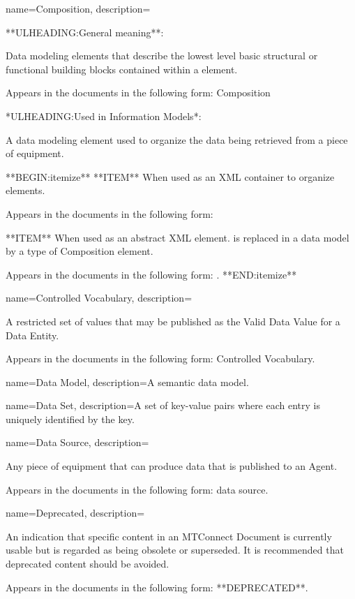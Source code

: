 {
    name={Composition},
	description={
  **ULHEADING:General meaning**:

  Data modeling elements that describe the lowest level basic structural or functional building blocks contained within a  element.

  Appears in the documents in the following form: \gls{Composition}

  *ULHEADING:Used in \gls{Information Models}*:

  A data modeling element used to organize the data being retrieved from a piece of equipment.

  **BEGIN:itemize**
      **ITEM** When used as an XML container to organize  elements. 
      
      Appears in the documents in the following form: 
      
      **ITEM** When used as an abstract XML element.  is replaced in a data model by a type of \gls{Composition} element. 
      
      Appears in the documents in the following form: .
  **END:itemize**
}
}

{
    name={Controlled Vocabulary},
	description={
	A restricted set of values that may be published as the \gls{Valid Data Value} for a \gls{Data Entity}.

	Appears in the documents in the following form: \gls{Controlled Vocabulary}.
}
}

{
    name={Data Model},
	description={A \gls{semantic data model}.}
}

{
    name={Data Set},
	description={A set of \gls{key-value pairs} where each entry is uniquely identified by the \gls{key}.}
}

{
    name={Data Source},
	description={
	Any piece of equipment that can produce data that is published to an \gls{Agent}.

	Appears in the documents in the following form: data source.
}
}

{
    name={Deprecated},
	description={
	An indication that specific content in an \gls{MTConnect Document} is currently usable but is regarded as being obsolete or superseded. It is recommended that deprecated content should be avoided.

	Appears in the documents in the following form: **DEPRECATED**.
}
}

